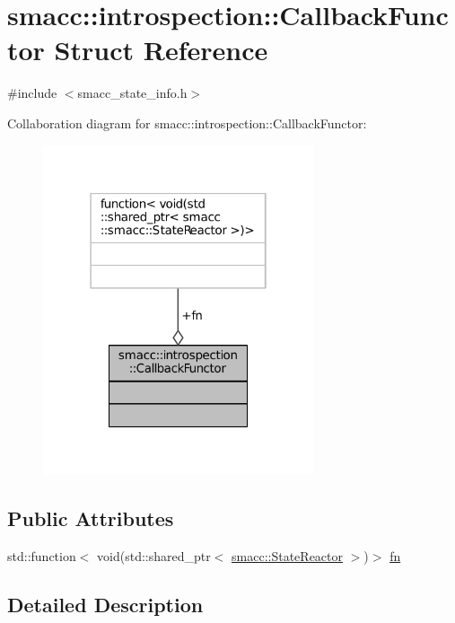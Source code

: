\hypertarget{structsmacc_1_1introspection_1_1CallbackFunctor}{}\section{smacc\+:\+:introspection\+:\+:Callback\+Functor Struct Reference}
\label{structsmacc_1_1introspection_1_1CallbackFunctor}


{\ttfamily \#include $<$smacc\+\_\+state\+\_\+info.\+h$>$}



Collaboration diagram for smacc\+:\+:introspection\+:\+:Callback\+Functor\+:
\nopagebreak
\begin{figure}[H]
\begin{center}
\leavevmode
\includegraphics[width=226pt]{structsmacc_1_1introspection_1_1CallbackFunctor__coll__graph}
\end{center}
\end{figure}
\subsection*{Public Attributes}
\begin{DoxyCompactItemize}
\item 
std\+::function$<$ void(std\+::shared\+\_\+ptr$<$ \hyperlink{classsmacc_1_1StateReactor}{smacc\+::\+State\+Reactor} $>$)$>$ \hyperlink{structsmacc_1_1introspection_1_1CallbackFunctor_a459e9ea2fb050739b927c4722c843e51}{fn}
\end{DoxyCompactItemize}


\subsection{Detailed Description}


